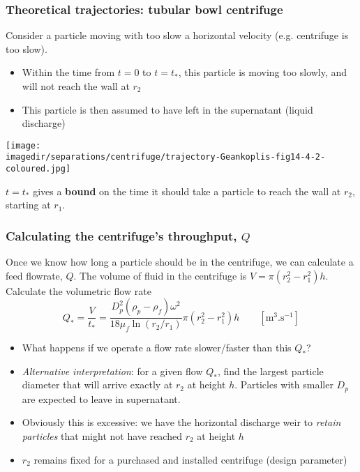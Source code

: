 \begin{frame}\frametitle{Theoretical trajectories: tubular bowl centrifuge}
	Consider a particle moving with too slow a horizontal velocity (e.g. centrifuge is too slow).
	\begin{itemize}
		\item	Within the time from $t=0$ to $t=t_*$, this particle is moving too slowly, and will not reach the wall at $r_2$ 
		\item	This particle is then assumed to have left in the supernatant (liquid discharge)
	\end{itemize}
	\begin{center}
		\texttt{[image: \\imagedir/separations/centrifuge/trajectory-Geankoplis-fig14-4-2-coloured.jpg]}
	\end{center}
	\vspace{-6pt}
	$t=t_*$ gives a \textbf{bound} on the time it should take a particle to reach the wall at $r_2$, starting at $r_1$.
\end{frame}

\begin{frame}\frametitle{Calculating the centrifuge's throughput, $Q$}
	Once we know how long a particle should be in the centrifuge, we can calculate a feed flowrate, $Q$.
	The volume of fluid in the centrifuge is $V = \pi \left(r_2^2 - r_1^2\right) h$. Calculate the volumetric flow rate
	\[
		Q_* = \frac{V}{t_*} = \frac{D_p^2\left(\rho_p - \rho_f\right)\omega^2}{18 \mu_f \ln (r_2/r_1)} \pi \left(r_2^2 - r_1^2\right) h \qquad[\text{m}^3.\text{s}^{-1}]
	\]
	\begin{itemize}
		\item	What happens if we operate a flow rate slower/faster than this $Q_*$?
		\item	\emph{Alternative interpretation}: for a given flow $Q_*$, find the largest particle diameter that will arrive exactly at $r_2$ at height $h$. Particles with smaller $D_p$ are expected to leave in supernatant.
		\item	Obviously this is excessive: we have the horizontal discharge weir to \emph{retain particles} that might not have reached $r_2$ at height $h$
		\item	$r_2$ remains fixed for a purchased and installed centrifuge (design parameter)
	\end{itemize}
\end{frame}

